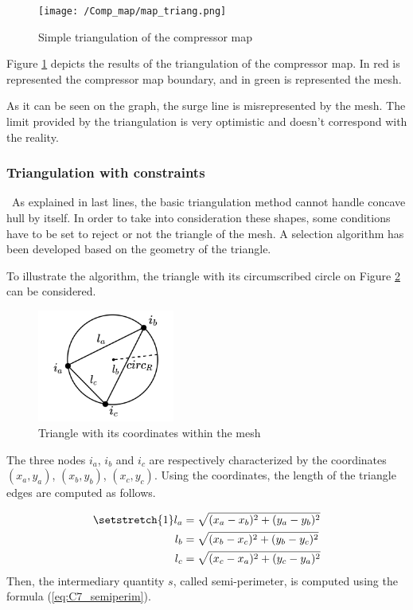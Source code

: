 \begin{figure}[h]
    \centering
    \texttt{[image: /Comp\_map/map\_triang.png]}
    \caption{Simple triangulation of the compressor map}
    \label{fig:C7_trimap}
\end{figure}

Figure \ref{fig:C7_trimap} depicts the results of the triangulation of the compressor map. In red is represented the compressor map boundary, and in green is represented the mesh.

As it can be seen on the graph, the surge line is misrepresented by the mesh. The limit provided by the triangulation is very optimistic and doesn't correspond with the reality. 

\subsubsection{Triangulation with constraints}
\quad\ As explained in last lines, the basic triangulation method cannot handle concave hull by itself. In order to take into consideration these shapes, some conditions have to be set to reject or not the triangle of the mesh. A selection algorithm  has been developed \cite{Dwyer2014} based on the geometry of the triangle.

To illustrate the algorithm, the triangle with its circumscribed circle on Figure \ref{fig:C7_triangmesh} can be considered.

\begin{figure}[h]
    \centering
    \includegraphics[width=0.4\textwidth]{Comp_map/triang_mesh.png}
    \caption{Triangle with its coordinates within the mesh}
    \label{fig:C7_triangmesh}
\end{figure}

The three nodes $i_a$, $i_b$ and $i_c$ are respectively characterized by the coordinates $(x_a,y_a)$, $(x_b,y_b)$, $(x_c,y_c)$. Using the coordinates, the length of the triangle edges are computed as follows.

\begin{align*}
    \setstretch{1}
    l_a &= \sqrt{(x_a - x_b)^2 + (y_a - y_b)^2}\\
    l_b &= \sqrt{(x_b - x_c)^2 + (y_b - y_c)^2}\\
    l_c &= \sqrt{(x_c - x_a)^2 + (y_c - y_a)^2}
\end{align*}
Then, the intermediary quantity $s$, called semi-perimeter, is computed using the formula (\ref{eq:C7_semiperim}).

